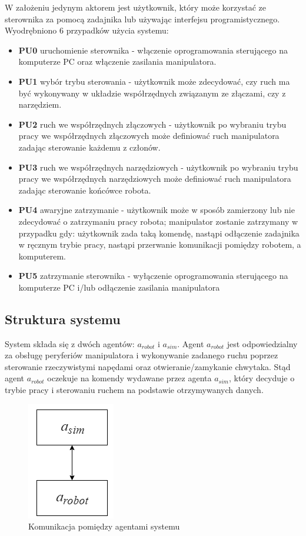 \documentclass[a4paper, 12pt, twoside]{article}
\begin{document}
W założeniu jedynym aktorem jest użytkownik, który może korzystać ze sterownika za pomocą zadajnika lub używając interfejsu programistycznego. Wyodrębniono 6 przypadków użycia systemu:

\begin{itemize}
\item \textbf{PU0} uruchomienie sterownika - włączenie oprogramowania sterującego na komputerze PC oraz włączenie zasilania manipulatora.
\item \textbf{PU1} wybór trybu sterowania - użytkownik może zdecydować, czy ruch ma być wykonywany w układzie współrzędnych związanym ze złączami, czy z narzędziem.
\item \textbf{PU2} ruch we współrzędnych złączowych - użytkownik po wybraniu trybu pracy we współrzędnych złączowych może definiować ruch manipulatora zadając sterowanie każdemu z członów.
\item \textbf{PU3} ruch we współrzędnych narzędziowych - użytkownik po wybraniu trybu pracy we współrzędnych narzędziowych może definiować ruch manipulatora zadając sterowanie końcówce robota.
\item \textbf{PU4} awaryjne zatrzymanie - użytkownik może w sposób zamierzony lub nie zdecydować o zatrzymaniu pracy robota; manipulator zostanie zatrzymany w przypadku gdy: użytkownik zada taką komendę, nastąpi odłączenie zadajnika w ręcznym trybie pracy, nastąpi przerwanie komunikacji pomiędzy robotem, a komputerem.
\item \textbf{PU5} zatrzymanie sterownika - wyłączenie oprogramowania sterującego na komputerze PC i/lub odłączenie zasilania manipulatora
\end{itemize} 

\subsection{Struktura systemu}

System składa się z dwóch agentów: $a_{robot}$ i $a_{sim}$. Agent $a_{robot}$ jest odpowiedzialny za obsługę peryferiów manipulatora i wykonywanie zadanego ruchu poprzez sterowanie rzeczywistymi napędami oraz otwieranie/zamykanie chwytaka. Stąd agent $a_{robot}$ oczekuje na komendy wydawane przez agenta $a_{sim}$, który decyduje o trybie pracy i sterowaniu ruchem na podstawie otrzymywanych danych.

\begin{figure}[hbt!]
\centering
\includegraphics[width=0.2\linewidth]{images/agent_comm.png}
\caption{Komunikacja pomiędzy agentami systemu}
\label{fig:agent_comm}
\end{figure}
\end{document}
